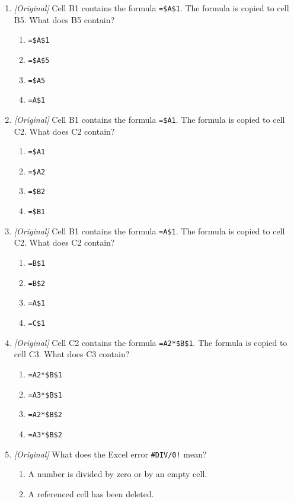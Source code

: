 \documentclass[11pt]{article}
\begin{document}
\begin{enumerate}[label=\textbf{Q\arabic*.}, leftmargin=*]
\item \textit{[Original]} Cell B1 contains the formula \texttt{=\$A\$1}. The
  formula is copied to cell B5. What does B5 contain?
  \begin{enumerate}[label=\Alph*.]
    \item \texttt{=\$A\$1}
    \item \texttt{=\$A\$5}
    \item \texttt{=\$A5}
    \item \texttt{=A\$1}
  \end{enumerate}
\item \textit{[Original]} Cell B1 contains the formula \texttt{=\$A1}. The
  formula is copied to cell C2. What does C2 contain?
  \begin{enumerate}[label=\Alph*.]
    \item \texttt{=\$A1}
    \item \texttt{=\$A2}
    \item \texttt{=\$B2}
    \item \texttt{=\$B1}
  \end{enumerate}
\item \textit{[Original]} Cell B1 contains the formula \texttt{=A\$1}. The
  formula is copied to cell C2. What does C2 contain?
  \begin{enumerate}[label=\Alph*.]
    \item \texttt{=B\$1}
    \item \texttt{=B\$2}
    \item \texttt{=A\$1}
    \item \texttt{=C\$1}
  \end{enumerate}
\item \textit{[Original]} Cell C2 contains the formula \texttt{=A2*\$B\$1}.
  The formula is copied to cell C3. What does C3 contain?
  \begin{enumerate}[label=\Alph*.]
    \item \texttt{=A2*\$B\$1}
    \item \texttt{=A3*\$B\$1}
    \item \texttt{=A2*\$B\$2}
    \item \texttt{=A3*\$B\$2}
  \end{enumerate}
\item \textit{[Original]} What does the Excel error \texttt{\#DIV/0!} mean?
  \begin{enumerate}[label=\Alph*.]
    \item A number is divided by zero or by an empty cell.
    \item A referenced cell has been deleted.

\end{enumerate}
\end{enumerate}
\end{document}
